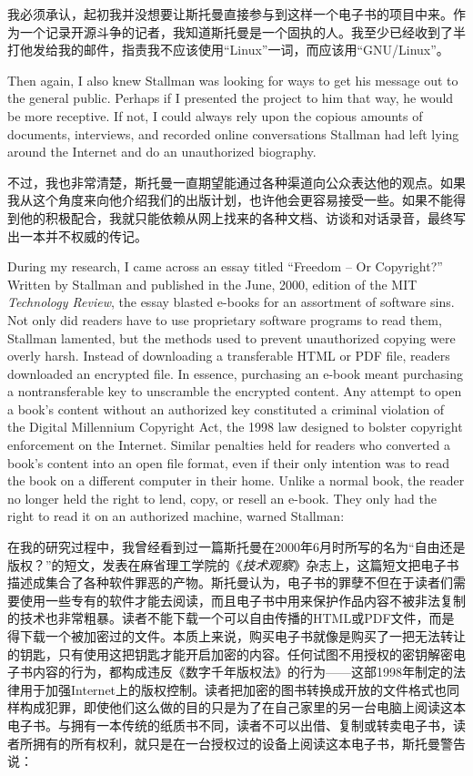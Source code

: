 \ifdefined\chs
我必须承认，起初我并没想要让斯托曼直接参与到这样一个电子书的项目中来。作为一个记录开源斗争的记者，我知道斯托曼是一个固执的人。我至少已经收到了半打他发给我的邮件，指责我不应该使用``Linux''一词，而应该用``GNU/Linux''。
\fi

\ifdefined\eng
Then again, I also knew Stallman was looking for ways to get his message out to the general public. Perhaps if I presented the project to him that way, he would be more receptive. If not, I could always rely upon the copious amounts of documents, interviews, and recorded online conversations Stallman had left lying around the Internet and do an unauthorized biography.
\fi

\ifdefined\chs
不过，我也非常清楚，斯托曼一直期望能通过各种渠道向公众表达他的观点。如果我从这个角度来向他介绍我们的出版计划，也许他会更容易接受一些。如果不能得到他的积极配合，我就只能依赖从网上找来的各种文档、访谈和对话录音，最终写出一本并不权威的传记。
\fi

\ifdefined\eng
During my research, I came across an essay titled ``Freedom -- Or Copyright?'' Written by Stallman and published in the June, 2000, edition of the MIT \textit{Technology Review}, the essay blasted e-books for an assortment of software sins. Not only did readers have to use proprietary software programs to read them, Stallman lamented, but the methods used to prevent unauthorized copying were overly harsh. Instead of downloading a transferable HTML or PDF file, readers downloaded an encrypted file. In essence, purchasing an e-book meant purchasing a nontransferable key to unscramble the encrypted content. Any attempt to open a book's content without an authorized key constituted a criminal violation of the Digital Millennium Copyright Act, the 1998 law designed to bolster copyright enforcement on the Internet. Similar penalties held for readers who converted a book's content into an open file format, even if their only intention was to read the book on a different computer in their home. Unlike a normal book, the reader no longer held the right to lend, copy, or resell an e-book. They only had the right to read it on an authorized machine, warned Stallman:
\fi

\ifdefined\chs
在我的研究过程中，我曾经看到过一篇斯托曼在2000年6月时所写的名为``自由还是版权？''的短文，发表在麻省理工学院的《\textit{技术观察}》杂志上，这篇短文把电子书描述成集合了各种软件罪恶的产物。斯托曼认为，电子书的罪孽不但在于读者们需要使用一些专有的软件才能去阅读，而且电子书中用来保护作品内容不被非法复制的技术也非常粗暴。读者不能下载一个可以自由传播的HTML或PDF文件，而是得下载一个被加密过的文件。本质上来说，购买电子书就像是购买了一把无法转让的钥匙，只有使用这把钥匙才能开启加密的内容。任何试图不用授权的密钥解密电子书内容的行为，都构成违反《数字千年版权法》的行为——这部1998年制定的法律用于加强Internet上的版权控制。读者把加密的图书转换成开放的文件格式也同样构成犯罪，即使他们这么做的目的只是为了在自己家里的另一台电脑上阅读这本电子书。与拥有一本传统的纸质书不同，读者不可以出借、复制或转卖电子书，读者所拥有的所有权利，就只是在一台授权过的设备上阅读这本电子书，斯托曼警告说：
\fi

